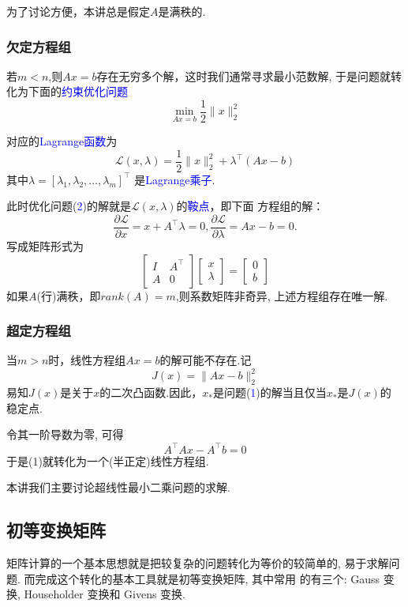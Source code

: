 \documentclass[12pt,a4paper]{article}
\begin{document}
\noindent 为了讨论方便，本讲总是假定$A$是满秩的.
\subsubsection{欠定方程组}
若$m<n$,则$Ax=b$存在无穷多个解，这时我们通常寻求最小范数解, 于是问题就转化为下面的\textcolor{blue}{约束优化问题}
\begin{equation}
\min _{Ax=b} \frac{1}{2}\|x\|_{2}^{2}
\end{equation}

\noindent 对应的\textcolor{blue}{Lagrange函数}为$$\mathcal{L}(x, \lambda)=\frac{1}{2}\|x\|_{2}^{2}+\lambda^{\top}(A x-b)$$
其中$\lambda=\left[\lambda_{1}, \lambda_{2}, \ldots, \lambda_{m}\right]^{\top}$
是\textcolor{blue}{Lagrange乘子}.

此时优化问题(\textcolor{blue}{2})的解就是$\mathcal{L}(x,\lambda)$的\textcolor{blue}{鞍点}，即下面
方程组的解：$$\frac{\partial \mathcal{L}}{\partial x}=x+{A}^{\top}
\lambda=0,\frac{\partial \mathcal{L}}{\partial \lambda}=Ax-b=0.$$
写成矩阵形式为$$
\left[\begin{array}{ll}{I} & {A^{\top}} \\ {A} &{0}\end{array}\right]\left[\begin{array}{l}{x} \\{\lambda}\end{array}\right]=\left[\begin{array}{l}{0} \\{b}\end{array}\right]
$$
如果$A$(行)满秩，即$rank(A)=m$,则系数矩阵非奇异, 上述方程组存在唯一解.

\subsubsection{超定方程组}
当$m>n$时，线性方程组$Ax=b$的解可能不存在.记$$J(x)=\|A x-b\|_{2}^{2}$$
易知$J(x)$是关于$x$的二次凸函数.因此，$x_*$是问题(\textcolor{blue}{1})的解当且仅当$x_*$是$J(x)$的
稳定点.

令其一阶导数为零, 可得$$A^{\top} A x-A^{\top} b=0$$
于是(1)就转化为一个(半正定)线性方程组.

本讲我们主要讨论超线性最小二乘问题的求解.
\subsection{初等变换矩阵}
矩阵计算的一个基本思想就是把较复杂的问题转化为等价的较简单的,
易于求解问题. 而完成这个转化的基本工具就是初等变换矩阵, 其中常用
的有三个: Gauss 变换, Householder 变换和 Givens 变换.
\end{document}

